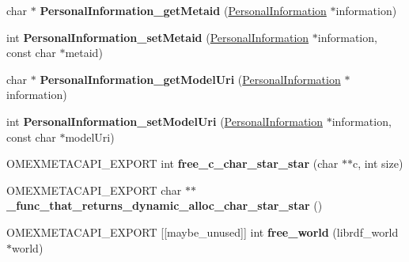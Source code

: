\begin{DoxyCompactItemize}
\item 
\mbox{\label{namespaceomexmeta_aba8bceb7297f33061319f06af29d14ec}} 
char $\ast$ {\bfseries Personal\+Information\+\_\+get\+Metaid} (\hyperlink{classomexmeta_1_1PersonalInformation}{Personal\+Information} $\ast$information)
\item 
\mbox{\label{namespaceomexmeta_ac71f84e1edff4f5023e02a607e9809f4}} 
int {\bfseries Personal\+Information\+\_\+set\+Metaid} (\hyperlink{classomexmeta_1_1PersonalInformation}{Personal\+Information} $\ast$information, const char $\ast$metaid)
\item 
\mbox{\label{namespaceomexmeta_a7a1a593f975f9b4c81a6f4b762eacb97}} 
char $\ast$ {\bfseries Personal\+Information\+\_\+get\+Model\+Uri} (\hyperlink{classomexmeta_1_1PersonalInformation}{Personal\+Information} $\ast$information)
\item 
\mbox{\label{namespaceomexmeta_af1b8bfaffdb6766ddaf1f52785436980}} 
int {\bfseries Personal\+Information\+\_\+set\+Model\+Uri} (\hyperlink{classomexmeta_1_1PersonalInformation}{Personal\+Information} $\ast$information, const char $\ast$model\+Uri)
\item 
\mbox{\label{namespaceomexmeta_ae46820e98812e5f7e15fba6c2fa5ea55}} 
O\+M\+E\+X\+M\+E\+T\+A\+C\+A\+P\+I\+\_\+\+E\+X\+P\+O\+RT int {\bfseries free\+\_\+c\+\_\+char\+\_\+star\+\_\+star} (char $\ast$$\ast$c, int size)
\item 
\mbox{\label{namespaceomexmeta_ada1c39e1f5456668968eabe1a0ff33ec}} 
O\+M\+E\+X\+M\+E\+T\+A\+C\+A\+P\+I\+\_\+\+E\+X\+P\+O\+RT char $\ast$$\ast$ {\bfseries \+\_\+func\+\_\+that\+\_\+returns\+\_\+dynamic\+\_\+alloc\+\_\+char\+\_\+star\+\_\+star} ()
\item 
\mbox{\label{namespaceomexmeta_a273e4922a97b016e54bbb441c23de885}} 
O\+M\+E\+X\+M\+E\+T\+A\+C\+A\+P\+I\+\_\+\+E\+X\+P\+O\+RT \mbox{[}\mbox{[}maybe\+\_\+unused\mbox{]}\mbox{]} int {\bfseries free\+\_\+world} (librdf\+\_\+world $\ast$world)
\item 
\mbox{\label{namespaceomexmeta_a5d07b1a3b03615813dbb9efb62efda45}} 

\end{DoxyCompactItemize}

